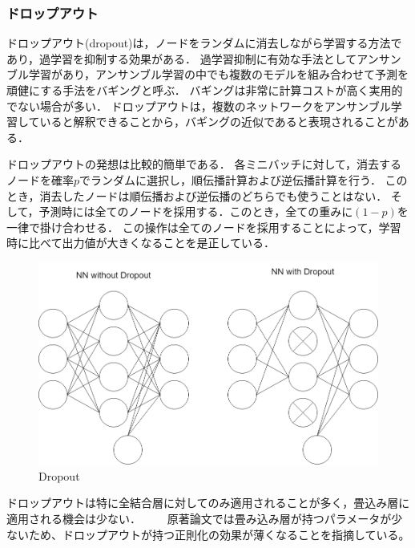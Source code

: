     \subsubsection{ドロップアウト}
    ドロップアウト\cite{srivastava2014dropout}(dropout)は，ノードをランダムに消去しながら学習する方法であり，過学習を抑制する効果がある．
    過学習抑制に有効な手法としてアンサンブル学習があり，アンサンブル学習の中でも複数のモデルを組み合わせて予測を頑健にする手法をバギングと呼ぶ．
    バギングは非常に計算コストが高く実用的でない場合が多い．
    ドロップアウトは，複数のネットワークをアンサンブル学習していると解釈できることから，バギングの近似であると表現されることがある．
    
    ドロップアウトの発想は比較的簡単である．
    各ミニバッチに対して，消去するノードを確率$p$でランダムに選択し，順伝播計算および逆伝播計算を行う．
    このとき，消去したノードは順伝播および逆伝播のどちらでも使うことはない．
    そして，予測時には全てのノードを採用する．このとき，全ての重みに$(1-p)$を一律で掛け合わせる．
    この操作は全てのノードを採用することによって，学習時に比べて出力値が大きくなることを是正している．
    \begin{figure}[ht]
        \begin{center}
            \includegraphics[width=12cm]{./8_appendix/img/dropout.png}
            \caption{Dropout}
        \end{center}
    \end{figure}

    ドロップアウトは特に全結合層に対してのみ適用されることが多く，畳込み層に適用される機会は少ない．
　　原著論文\cite{srivastava2014dropout}では畳み込み層が持つパラメータが少ないため、ドロップアウトが持つ正則化の効果が薄くなることを指摘している。
    

